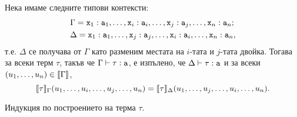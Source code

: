 \begin{proposition}
  Нека имаме следните типови контексти:
  \begin{align*}
    &\Gamma = \texttt{x}_1:\texttt{a}_1, \dots, \texttt{x}_i:\texttt{a}_i, \dots, \texttt{x}_j:\texttt{a}_j, \dots, \texttt{x}_n:\texttt{a}_n;\\
    &\Delta = \texttt{x}_1:\texttt{a}_1, \dots, \texttt{x}_j:\texttt{a}_j, \dots, \texttt{x}_i:\texttt{a}_i, \dots, \texttt{x}_n:\texttt{a}_n,
  \end{align*}
  т.е. $\Delta$ се получава от $\Gamma$ като разменим местата на $i$-тата и $j$-тата двойка.
  Тогава за всеки терм $\tau$, такъв че $\Gamma \vdash \tau : \texttt{a}$, е изпълено, че $\Delta \vdash \tau : \texttt{a}$ и за всеки $(u_1,\dots,u_n) \in \llbracket{\Gamma}\rrbracket$,
  \[\llbracket{\tau}\rrbracket_\Gamma(u_1,\dots,u_i,\dots,u_j,\dots,u_n) = \llbracket{\tau}\rrbracket_\Delta(u_1,\dots,u_j,\dots,u_i,\dots,u_n).\]
\end{proposition}
\begin{hint}
  Индукция по построението на терма $\tau$.
\end{hint}


